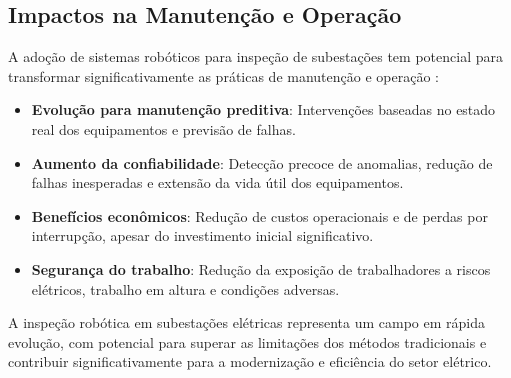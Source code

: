 \subsection{Impactos na Manutenção e Operação}

A adoção de sistemas robóticos para inspeção de subestações tem potencial para transformar significativamente as práticas de manutenção e operação \cite{Wang2024Advancements, GlobalGrowthInsights2024}:

\begin{itemize}
    \item \textbf{Evolução para manutenção preditiva}: Intervenções baseadas no estado real dos equipamentos e previsão de falhas.
    \item \textbf{Aumento da confiabilidade}: Detecção precoce de anomalias, redução de falhas inesperadas e extensão da vida útil dos equipamentos.
    \item \textbf{Benefícios econômicos}: Redução de custos operacionais e de perdas por interrupção, apesar do investimento inicial significativo.
    \item \textbf{Segurança do trabalho}: Redução da exposição de trabalhadores a riscos elétricos, trabalho em altura e condições adversas.
\end{itemize}

A inspeção robótica em subestações elétricas representa um campo em rápida evolução, com potencial para superar as limitações dos métodos tradicionais e contribuir significativamente para a modernização e eficiência do setor elétrico.
